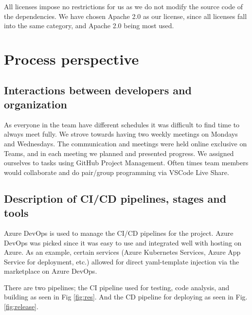 \documentclass{article}
\begin{document}
All licenses impose no restrictions for us as we do not modify the source code of the dependencies. We have chosen Apache 2.0 as our license, since all licenses fall into the same category, and Apache 2.0 being most used. 

\section{Process perspective}
\subsection{Interactions between developers and organization}
As everyone in the team have different schedules it was difficult to find time to always meet fully. We strove towards having two weekly meetings on Mondays and Wednesdays. The communication and meetings were held online exclusive on Teams, and in each meeting we planned and presented progress. We assigned ourselves to tasks using GitHub Project Management. Often times team members would collaborate and do pair/group programming via VSCode Live Share.

\subsection{Description of CI/CD pipelines, stages and tools}
Azure DevOps is used to manage the CI/CD pipelines for the project. Azure DevOps was picked since it was easy to use and integrated well with hosting on Azure. As an example, certain services (Azure Kubernetes Services, Azure App Service for deployment, etc.) allowed for direct yaml-template injection via the marketplace on Azure DevOps.

There are two pipelines; the CI pipeline used for testing, code analysis, and building as seen in Fig \ref{fig:res}. And the CD pipeline for deploying as seen in Fig. \ref{fig:release}. 
\end{document}
